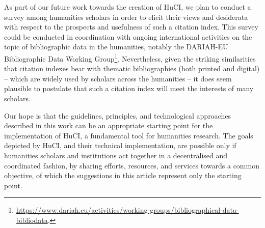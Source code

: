 As part of our future work towards the creation of HuCI, we plan to conduct a survey among humanities scholars in order to elicit their views and desiderata with respect to the prospects and usefulness of such a citation index. This survey could be conducted in coordination with ongoing international activities on the topic of bibliographic data in the humanities, notably the DARIAH-EU Bibliographic Data Working Group\footnote{\url{https://www.dariah.eu/activities/working-groups/bibliographical-data-bibliodata}.}. Nevertheless, given the striking similarities that citation indexes bear with thematic bibliographies (both printed and digital) -- which are widely used by scholars across the humanities -- it does seem plausible to postulate that such a citation index will meet the interests of many scholars.

Our hope is that the guidelines, principles, and technological approaches described in this work can be an appropriate starting point for the implementation of HuCI, a fundamental tool for humanities research. The goals depicted by HuCI, and their technical implementation, are possible only if humanities scholars and institutions act together in a decentralised and coordinated fashion, by sharing efforts, resources, and services towards a common objective, of which the suggestions in this article represent only the starting point. 
